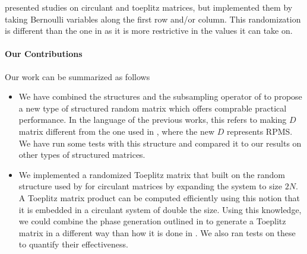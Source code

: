\cite{wotao} presented studies on circulant and toeplitz matrices, but implemented them by taking Bernoulli variables along the first row and/or column. This randomization is different than the one in \cite{romberg2009} as it is more restrictive in the values it can take on. 

\paragraph{Our Contributions}
Our work can be summarized as follows
\begin{itemize}
	\item We have combined the structures \cite{doetal} and the subsampling operator 
		of \cite{romberg2009} to propose a new type of structured random matrix which offers 
		comprable practical performance. In the language of the previous works, this refers
		to making $D$ matrix different from the one used in \cite{doetal}, where the new $D$
		represents RPMS. We have run some tests with this structure and compared it to 
		our results on other types of structured matrices.
	\item We implemented a randomized Toeplitz matrix that built on the random structure
		used by \cite{romberg2009} for circulant matrices by expanding the system to size
		$2N$. A Toeplitz matrix product can be computed efficiently using this notion that 
		it is embedded in a circulant system of double the size. Using this knowledge, we 
		could combine the phase generation outlined in \cite{romberg2009} to generate a 
		Toeplitz matrix in a different way than how it is done in \cite{wotao}. We also ran 
		tests on these to quantify their effectiveness. 
\end{itemize}

